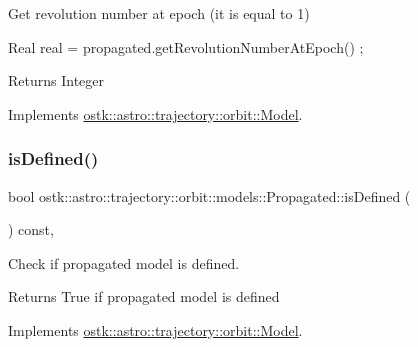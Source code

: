 Get revolution number at epoch (it is equal to 1) 


\begin{DoxyCode}
Real real = propagated.getRevolutionNumberAtEpoch() ;
\end{DoxyCode}


\begin{DoxyReturn}{Returns}
Integer 
\end{DoxyReturn}


Implements \hyperlink{classostk_1_1astro_1_1trajectory_1_1orbit_1_1_model_af3f1866f86045da2c05efe4165735cf4}{ostk\+::astro\+::trajectory\+::orbit\+::\+Model}.

\mbox{\label{classostk_1_1astro_1_1trajectory_1_1orbit_1_1models_1_1_propagated_a530fd6bc017c74dedc43ced5fe843a03}} 
\subsubsection{\texorpdfstring{is\+Defined()}{isDefined()}}
{\footnotesize\ttfamily bool ostk\+::astro\+::trajectory\+::orbit\+::models\+::\+Propagated\+::is\+Defined (\begin{DoxyParamCaption}{ }\end{DoxyParamCaption}) const\hspace{0.3cm}{\ttfamily [override]}, {\ttfamily [virtual]}}



Check if propagated model is defined. 

\begin{DoxyReturn}{Returns}
True if propagated model is defined 
\end{DoxyReturn}


Implements \hyperlink{classostk_1_1astro_1_1trajectory_1_1orbit_1_1_model_a13c5b5693dd86a072da0bd0e319bacc2}{ostk\+::astro\+::trajectory\+::orbit\+::\+Model}.

\mbox{\label{classostk_1_1astro_1_1trajectory_1_1orbit_1_1models_1_1_propagated_a71c17288a6039ddcc1a5d3e5e62e1f35}} 
